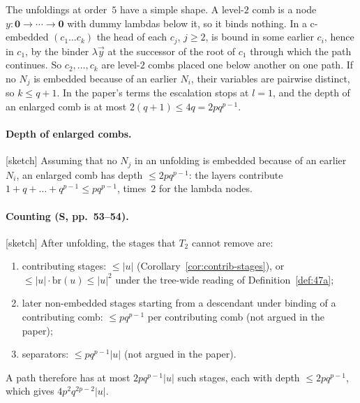 \documentclass[11pt]{article}
\newcommand{\Ground}{\mathbf{0}}
\newcommand{\br}{\mathrm{br}}
\newcommand{\Sketch}{\textsf{[sketch]}}
\theoremstyle{plain}
\theoremstyle{definition}
\theoremstyle{remark}
\begin{document}
The unfoldings at order~$5$ have a simple shape.  A level-$2$ comb is a
node $y:\Ground\to\cdots\to\Ground$ with dummy lambdas below it, so it
binds nothing.  In a c-embedded $(c_1\dots c_k)$ the head of each $c_j$,
$j\ge2$, is bound in some earlier $c_i$, hence in $c_1$, by the binder
$\lambda\vec y$ at the successor of the root of $c_1$ through which the
path continues.  So $c_2,\dots,c_k$ are level-$2$ combs placed one below another on one
path.  If no $N_j$ is embedded because of an earlier $N_i$, their
variables are pairwise distinct, so $k\le q+1$.  In the paper's terms
the escalation stops at $l=1$, and the depth of an enlarged comb is at
most $2(q+1)\le4q=2pq^{p-1}$.

\paragraph{Depth of enlarged combs.}
\Sketch{} Assuming that no $N_j$ in an unfolding is embedded because of
an earlier $N_i$, an enlarged comb has depth $\le2pq^{p-1}$: the layers
contribute $1+q+\dots+q^{p-1}\le pq^{p-1}$, times~$2$ for the lambda
nodes.

\paragraph{Counting (S, pp.~53--54).}
\Sketch{} After unfolding, the stages that $T_2$ cannot remove are:
\begin{enumerate}
\item contributing stages: $\le|u|$ (Corollary~\ref{cor:contrib-stages}),
  or $\le|u|\cdot\br(u)\le|u|^2$ under the tree-wide reading of
  Definition~\ref{def:47a};
\item later non-embedded stages starting from a descendant under
  binding of a contributing comb: $\le pq^{p-1}$ per contributing comb
  (not argued in the paper);
\item separators: $\le pq^{p-1}|u|$ (not argued in the paper).
\end{enumerate}
A path therefore has at most $2pq^{p-1}|u|$ such stages, each with
depth $\le2pq^{p-1}$, which gives $4p^2q^{2p-2}|u|$.
\end{document}
